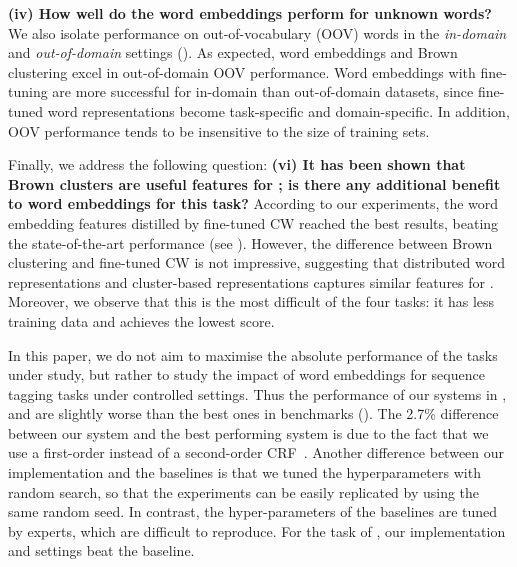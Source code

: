 \textbf{(iv) How well do the word embeddings perform for unknown words?}
We also isolate performance on out-of-vocabulary (OOV) words 
in the \textit{in-domain} and \textit{out-of-domain} settings ().
As expected, word embeddings and Brown clustering excel in out-of-domain OOV performance.
Word embeddings with fine-tuning are more successful for 
in-domain than out-of-domain datasets, since fine-tuned
word representations become task-specific and domain-specific. 
In addition, OOV performance tends to be insensitive to the size of training sets.

Finally, we address the following question: \textbf{(vi) It has been shown that Brown clusters are useful features for \mwe; is there any additional benefit to word embeddings for this task?} 
According to our experiments, the word embedding features distilled by fine-tuned CW reached the best results, beating the state-of-the-art performance (see ).
However, the difference between Brown clustering and fine-tuned CW is not impressive, suggesting that distributed word representations and cluster-based representations captures similar features for \mwe. Moreover, we observe that this is the most difficult of the four tasks: it has less training data and achieves the lowest score.


In this paper, we do not aim to maximise the absolute performance of the tasks under 
study, but rather to study the impact of word embeddings for sequence tagging tasks under controlled settings. Thus the performance of our systems in \ner, \pos and \chunking are slightly worse than the best ones in benchmarks (). The 2.7\% difference between our \ner system and the best performing system is due to the fact that we use a first-order instead of a second-order CRF~\cite{Ando:2005}. 
Another difference between our implementation and the baselines is that we tuned the hyperparameters with random search, so that the experiments can be easily replicated by using the same random seed. In contrast, the hyper-parameters of the baselines are tuned by experts, which are difficult to reproduce. For the task of \mwe, our implementation and settings beat the baseline.




